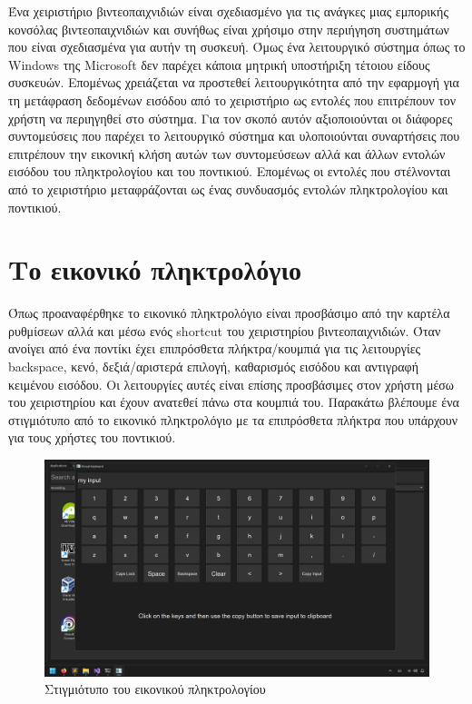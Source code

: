 Ένα χειριστήριο βιντεοπαιχνιδιών είναι σχεδιασμένο για τις ανάγκες μιας εμπορικής κονσόλας
βιντεοπαιχνιδιών και συνήθως είναι χρήσιμο στην περιήγηση συστημάτων που είναι σχεδιασμένα
για αυτήν τη συσκευή. Όμως ένα λειτουργικό σύστημα όπως το Windows της Microsoft δεν
παρέχει κάποια μητρική υποστήριξη τέτοιου είδους συσκευών. Επομένως χρειάζεται να προστεθεί
λειτουργικότητα από την εφαρμογή για τη μετάφραση δεδομένων εισόδου από το χειριστήριο ως
εντολές που επιτρέπουν τον χρήστη να περιηγηθεί στο σύστημα. Για τον σκοπό αυτόν αξιοποιούνται
οι διάφορες συντομεύσεις που παρέχει το λειτουργικό σύστημα και υλοποιούνται συναρτήσεις που
επιτρέπουν την εικονική κλήση αυτών των συντομεύσεων αλλά και άλλων εντολών εισόδου του
πληκτρολογίου και του ποντικιού. Επομένως οι εντολές που στέλνονται από το χειριστήριο μεταφράζονται
ως ένας συνδυασμός εντολών πληκτρολογίου και ποντικιού. 



\section{Το εικονικό πληκτρολόγιο}
Όπως προαναφέρθηκε το εικονικό πληκτρολόγιο είναι προσβάσιμο από την καρτέλα ρυθμίσεων αλλά και
μέσω ενός shortcut του χειριστηρίου βιντεοπαιχνιδιών. Όταν ανοίγει από ένα ποντίκι έχει επιπρόσθετα
πλήκτρα/κουμπιά για τις λειτουργίες backspace, κενό, δεξιά/αριστερά επιλογή, καθαρισμός εισόδου και
αντιγραφή κειμένου εισόδου. Οι λειτουργίες αυτές είναι επίσης προσβάσιμες στον χρήστη μέσω του
χειριστηρίου και έχουν ανατεθεί πάνω στα κουμπιά του. Παρακάτω βλέπουμε ένα στιγμιότυπο από το
εικονικό πληκτρολόγιο με τα επιπρόσθετα πλήκτρα που υπάρχουν για τους χρήστες του ποντικιού.







\begin{figure}[H]
    \centering
    \includegraphics[width=1.0\textwidth]{./images/virtual_keyboard.png}
    \caption{Στιγμιότυπο του εικονικού πληκτρολογίου}
\end{figure}
